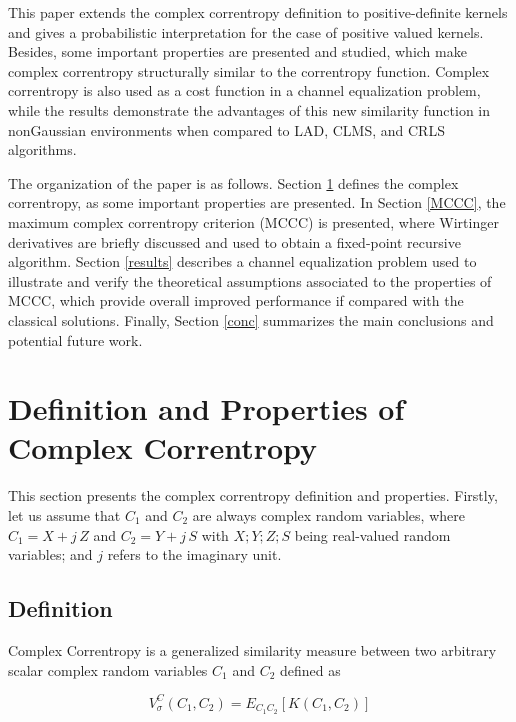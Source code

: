 \documentclass[preprint,12pt]{elsarticle}
\begin{document}
This paper extends the complex correntropy definition to positive-definite kernels and gives a probabilistic interpretation for the case of positive valued kernels. Besides, some important properties are presented and studied, which make complex correntropy structurally similar to the correntropy function. Complex correntropy is also used as a cost function in a channel equalization problem, while the results demonstrate the advantages of this new similarity function in nonGaussian environments when compared to LAD, CLMS, and CRLS algorithms.


The organization of the paper is as follows. Section \ref{PI} defines the complex correntropy, as some important properties are presented. In Section \ref{MCCC}, the maximum complex correntropy criterion (MCCC) is presented, where Wirtinger derivatives are briefly discussed and used to obtain a fixed-point recursive algorithm. Section \ref{results} describes a channel equalization problem used to illustrate and verify the theoretical assumptions associated to the properties of MCCC, which provide overall improved performance if compared with the classical solutions. Finally, Section \ref{conc} summarizes the main conclusions and potential future work. 



\section{Definition and Properties of Complex Correntropy }
\label{PI}

This section presents the complex correntropy definition and properties. Firstly, let us assume that $C_1$ and $C_2$ are always complex random variables, where $C_{1}=X+j\,Z$ and  $C_{2} = Y+j\,S$ with $X;Y;Z;S$  being real-valued random variables; and $j$ refers to the imaginary unit.



\subsection{Definition}


Complex Correntropy is a generalized similarity measure between two arbitrary scalar complex random variables $C_{1}$ and $C_{2}$ defined as

\begin{equation}\label{correntropia_complexa}
V^{C}_{\sigma}(C_{1},C_{2}) =  E_{C_{1}C_{2}}[ K(C_{1},C_{2}) ]
\end{equation}
\end{document}
